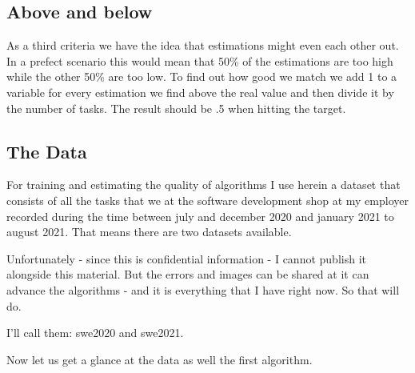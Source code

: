 \hypertarget{above-and-below}{%
\subsection{Above and below}\label{above-and-below}}

As a third criteria we have the idea that estimations might even each
other out. In a prefect scenario this would mean that 50\% of the
estimations are too high while the other 50\% are too low. To find out
how good we match we add 1 to a variable for every estimation we find
above the real value and then divide it by the number of tasks. The
result should be .5 when hitting the target.

\hypertarget{the-data}{%
\subsection{The Data}\label{the-data}}

For training and estimating the quality of algorithms I use herein a
dataset that consists of all the tasks that we at the software
development shop at my employer recorded during the time between july
and december 2020 and january 2021 to august 2021. That means there are
two datasets available.

Unfortunately - since this is confidential information - I cannot
publish it alongside this material. But the errors and images can be
shared at it can advance the algorithms - and it is everything that I
have right now. So that will do.

I'll call them: swe2020 and swe2021.

Now let us get a glance at the data as well the first algorithm.
